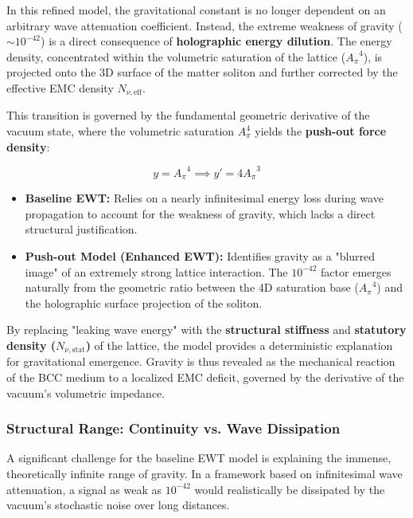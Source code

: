 \documentclass[10pt,a4paper]{article}
\begin{document}
In this refined model, the gravitational constant is no longer dependent on an arbitrary wave attenuation coefficient. Instead, the extreme weakness of gravity ($\sim 10^{-42}$) is a direct consequence of \textbf{holographic energy dilution}. The energy density, concentrated within the volumetric saturation of the lattice (${A_{\pi}}^4$), is projected onto the 3D surface of the matter soliton and further corrected by the effective EMC density $N_{\nu, \text{eff}}$.

This transition is governed by the fundamental geometric derivative of the vacuum state, where the volumetric saturation $A_{\pi}^4$ yields the \textbf{push-out force density}:

\begin{equation}
	y = {A_{\pi}}^4 \implies y' = 4 {A_{\pi}}^3
\end{equation}

\begin{itemize}
	\item \textbf{Baseline EWT:} Relies on a nearly infinitesimal energy loss during wave propagation to account for the weakness of gravity, which lacks a direct structural justification.
	\item \textbf{Push-out Model (Enhanced EWT):} Identifies gravity as a "blurred image" of an extremely strong lattice interaction. The $10^{-42}$ factor emerges naturally from the geometric ratio between the 4D saturation base (${A_{\pi}}^4$) and the holographic surface projection of the soliton.
\end{itemize}

By replacing "leaking wave energy" with the \textbf{structural stiffness} and \textbf{statutory density ($N_{\nu, \text{stat}}$)} of the lattice, the model provides a deterministic explanation for gravitational emergence. Gravity is thus revealed as the mechanical reaction of the BCC medium to a localized EMC deficit, governed by the derivative of the vacuum's volumetric impedance.

\subsubsection*{Structural Range: Continuity vs. Wave Dissipation}

A significant challenge for the baseline EWT model is explaining the immense, theoretically infinite range of gravity. In a framework based on infinitesimal wave attenuation, a signal as weak as $10^{-42}$ would realistically be dissipated by the vacuum's stochastic noise over long distances. 
\end{document}
